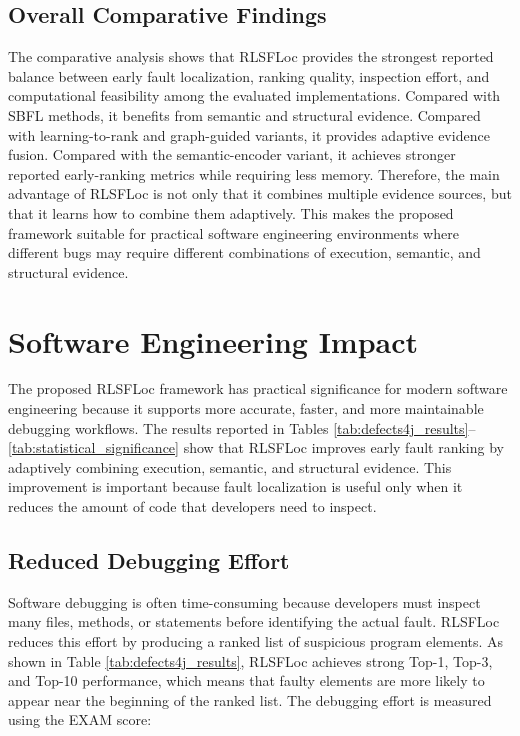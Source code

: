 \documentclass[article,article,submit,pdftex,moreauthors]{Definitions/mdpi}
\begin{document}
\subsection{Overall Comparative Findings}

The comparative analysis shows that RLSFLoc provides the strongest reported balance between early fault localization, ranking quality, inspection effort, and computational feasibility among the evaluated implementations. Compared with SBFL methods, it benefits from semantic and structural evidence. Compared with learning-to-rank and graph-guided variants, it provides adaptive evidence fusion. Compared with the semantic-encoder variant, it achieves stronger reported early-ranking metrics while requiring less memory. Therefore, the main advantage of RLSFLoc is not only that it combines multiple evidence sources, but that it learns how to combine them adaptively. This makes the proposed framework suitable for practical software engineering environments where different bugs may require different combinations of execution, semantic, and structural evidence.

\section{Software Engineering Impact}
\label{sec:software_engineering_impact}

The proposed RLSFLoc framework has practical significance for modern software engineering because it supports more accurate, faster, and more maintainable debugging workflows. The results reported in Tables \ref{tab:defects4j_results}--\ref{tab:statistical_significance} show that RLSFLoc improves early fault ranking by adaptively combining execution, semantic, and structural evidence. This improvement is important because fault localization is useful only when it reduces the amount of code that developers need to inspect.

\subsection{Reduced Debugging Effort}

Software debugging is often time-consuming because developers must inspect many files, methods, or statements before identifying the actual fault. RLSFLoc reduces this effort by producing a ranked list of suspicious program elements. As shown in Table \ref{tab:defects4j_results}, RLSFLoc achieves strong Top-1, Top-3, and Top-10 performance, which means that faulty elements are more likely to appear near the beginning of the ranked list. The debugging effort is measured using the EXAM score:
\end{document}
